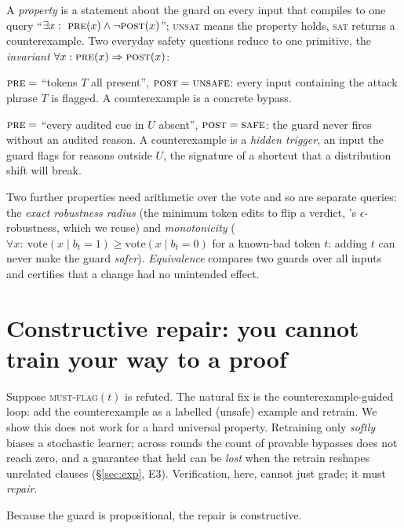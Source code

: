 \documentclass[11pt]{article}
\begin{document}
A \emph{property} is a statement about the guard on every input that compiles to one
query ``$\exists x:\ \textsc{pre}(x)\wedge\neg\textsc{post}(x)$''; \textsc{unsat}
means the property holds, \textsc{sat} returns a counterexample. Two everyday safety
questions reduce to one primitive, the \emph{invariant} $\forall x:
\textsc{pre}(x)\Rightarrow\textsc{post}(x)$:
\begin{description}[leftmargin=1.2em,itemsep=2pt]
\item[No-bypass / must-flag.] $\textsc{pre}=$ ``tokens $T$ all present'',
$\textsc{post}=\textsc{unsafe}$: every input containing the attack phrase $T$ is
flagged. A counterexample is a concrete bypass.
\item[Trigger-necessity (no spurious cue).] $\textsc{pre}=$ ``every audited cue in
$U$ absent'', $\textsc{post}=\textsc{safe}$: the guard never fires without an
audited reason. A counterexample is a \emph{hidden trigger}, an input the guard
flags for reasons outside $U$, the signature of a shortcut that a distribution shift
will break.
\end{description}
Two further properties need arithmetic over the vote and so are separate queries:
the \emph{exact robustness radius} (the minimum token edits to flip a verdict, \citeauthor{przybysz2023verifying}'s $\epsilon$-robustness, which we reuse) and
\emph{monotonicity} ($\forall x:\ \mathrm{vote}(x{\mid}b_t{=}1)\ge
\mathrm{vote}(x{\mid}b_t{=}0)$ for a known-bad token $t$: adding $t$ can never make
the guard \emph{safer}). \emph{Equivalence} compares two guards over all inputs and
certifies that a change had no unintended effect.

\section{Constructive repair: you cannot train your way to a proof}
\label{sec:repair}

Suppose \textsc{must-flag}$(t)$ is refuted. The natural fix is the
counterexample-guided loop: add the counterexample as a labelled (unsafe) example
and retrain. We show this does not work for a hard universal property. Retraining
only \emph{softly} biases a stochastic learner; across rounds the count of provable
bypasses does not reach zero, and a guarantee that held can be \emph{lost} when the
retrain reshapes unrelated clauses (\S\ref{sec:exp}, E3). Verification, here, cannot
just grade; it must \emph{repair}.

Because the guard is propositional, the repair is constructive.
\end{document}
